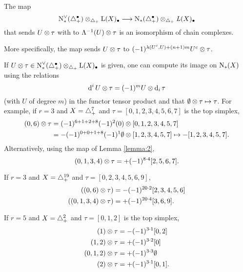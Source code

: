 \begin{lemma}\label{lemma:2} The map
	\[
	\operatorname{N}^\vee_{*}(\triangle_{+}^\bullet) \otimes_{\triangle_{+}} \operatorname{L}(X)_\bullet \longrightarrow \operatorname{N}_{*}(\triangle_{+}^\bullet) \otimes_{\triangle_{+}} \operatorname{{\it L}}(X)_\bullet
	\]
	that sends $U \otimes \tau$ with to $\Lambda^{-1}(U) \otimes \tau$ is an isomorphism of chain complexes.
\end{lemma}
More specifically, the map sends $U \otimes \tau$ to $(-1)^{\lambda(U^c,U)+(n+1)m} U^c \otimes \tau$.
\begin{example}\label{example:first3} If $U \otimes \tau\in \operatorname{N}^\vee_{*}(\triangle_{+}^\bullet) \otimes_{\triangle_{+}} \operatorname{L}(X)_\bullet$ is given, one can compute its image on $\operatorname{N}_{*}(X)$ using the relations
\[
	\operatorname{d}^i U \otimes \tau = (-1)^{m} U \otimes \operatorname{d}_i\tau
\]
 (with $U$ of degree $m$) in the functor tensor product and that $\emptyset \otimes \tau \mapsto \tau$. For example, if $r=3$ and $X=\triangle_{+}^7$ and $\tau = [0,1,2,3,4,5,6,7]$ is the top simplex,
\begin{align*}
		(0,6) \otimes \tau &= (-1)^{6+1+2+8}(-1)^2(0) \otimes [0,1,2,3,4,5,7]
		\\
		&= -(-1)^{0+0+1+8}(-1)^1\emptyset \otimes [1,2,3,4,5,7]\mapsto -[1,2,3,4,5,7].
\end{align*}
Alternatively, using the map of Lemma \ref{lemma:2},
\[
	(0,1,3,4) \otimes \tau = +(-1)^{8\cdot 4}[2,5,6,7].
\]
	\end{example}
	\begin{example}\label{example:first3'} If $r=3$ and $X=\triangle_{+}^{19}$ and $\tau = [0,2,3,4,5,6,9]$,
\begin{align*}
		((0,6) \otimes \tau) &= -(-1)^{20\cdot 2} [2,3,4,5,6]
		\\
		((0,1,3,4) \otimes \tau) &= +(-1)^{20\cdot 4}[3,6,9].
	\end{align*}
	\end{example}
	\begin{example}\label{example:first5} If $r=5$ and $X=\triangle_{+}^2$ and $\tau = [0,1,2]$ is the top simplex,
	\[
	\begin{split}
		(1) \otimes \tau &= - (-1)^{3\cdot 1} [0,2]
		\\
		(1,2) \otimes \tau &= +(-1)^{3\cdot 2} [0]
		\\
		(0,1,2) \otimes \tau &= +(-1)^{3\cdot 3}\emptyset
		\\
		(2) \otimes \tau &= +(-1)^{3\cdot 1} [0,1].
		\end{split}
	\]
	\end{example}

